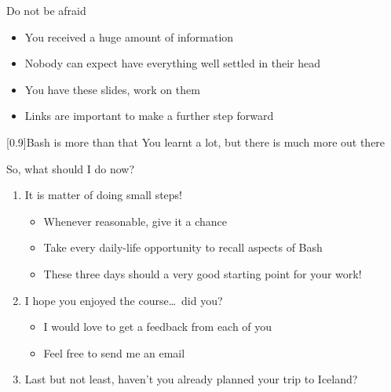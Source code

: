 
\begin{frame}{Do not be afraid}
    \begin{itemize}
        \item You received a huge amount of information
        \item Nobody can expect have everything well settled in their head
        \item You have these slides, work on them
        \item Links are important to make a further step forward
    \end{itemize}
    \begin{varblock}{}[0.9\textwidth]{Bash is more than that}
        You learnt a lot, but there is much more out there
    \end{varblock}
\end{frame}
\begin{frame}{So, what should I do now?}
    \begin{enumerate}
        \item<1-> It is matter of doing small steps!
                  \begin{itemize}
                    \item Whenever reasonable, give it a chance
                    \item Take every daily-life opportunity to recall aspects of Bash
                    \item These three days should a very good starting point for your work!
                  \end{itemize}
        \item<2-> I hope you enjoyed the course\ldots\ did you?\\
                  \begin{itemize}
                      \item I would love to get a feedback from each of you
                      \item Feel free to send me an email \,\href{mailto:sciarra@itp.uni-frankfurt.de}{{\small\Letter}}
                  \end{itemize}
        \item<3-> Last but not least, haven't you already planned your trip to Iceland? $\;$
    \end{enumerate}
    
\end{frame}